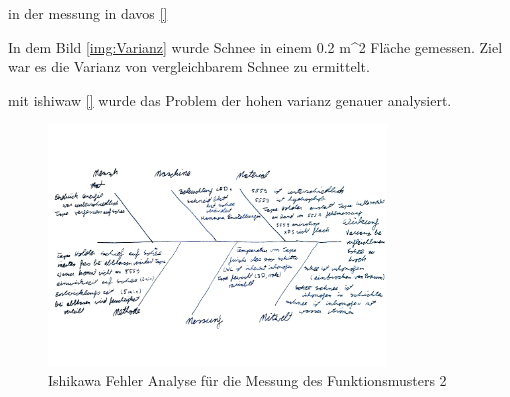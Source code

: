 in der messung in davos \ref{}

In dem Bild \ref{img:Varianz} wurde Schnee in einem 0.2 m^2 Fläche gemessen. Ziel war es die Varianz von vergleichbarem Schnee zu ermittelt.

mit ishiwaw \ref{} wurde das Problem der hohen varianz genauer analysiert.


\begin{figure}
    \centering
    \includegraphics[width=0.8\textwidth]{Bilder/IshikawaDavos.jpg}
    \caption{Ishikawa Fehler Analyse für die Messung des Funktionsmusters 2}
    \label{fig:IshikwaDavos}
\end{figure}



